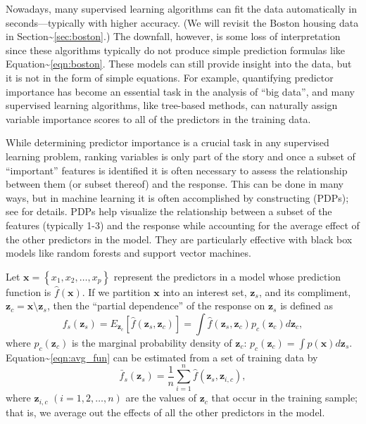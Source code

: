 Nowadays, many supervised learning algorithms can fit the data
automatically in seconds---typically with higher accuracy. (We will
revisit the Boston housing data in
Section\textasciitilde{}\ref{sec:boston}.) The downfall, however, is
some loss of interpretation since these algorithms typically do not
produce simple prediction formulas like
Equation\textasciitilde{}\eqref{eqn:boston}. These models can still
provide insight into the data, but it is not in the form of simple
equations. For example, quantifying predictor importance has become an
essential task in the analysis of ``big data'', and many supervised
learning algorithms, like tree-based methods, can naturally assign
variable importance scores to all of the predictors in the training
data.

While determining predictor importance is a crucial task in any
supervised learning problem, ranking variables is only part of the story
and once a subset of ``important'' features is identified it is often
necessary to assess the relationship between them (or subset thereof)
and the response. This can be done in many ways, but in machine learning
it is often accomplished by constructing 
(PDPs); see \citet{friedman-2001-greedy} for details. PDPs help
visualize the relationship between a subset of the features (typically
1-3) and the response while accounting for the average effect of the
other predictors in the model. They are particularly effective with
black box models like random forests and support vector machines.

Let \(\boldsymbol{x} = \left\{x_1, x_2, \dots, x_p\right\}\) represent
the predictors in a model whose prediction function is
\(\widehat{f}\left(\boldsymbol{x}\right)\). If we partition
\(\boldsymbol{x}\) into an interest set, \(\boldsymbol{z}_s\), and its
compliment,
\(\boldsymbol{z}_c = \boldsymbol{x} \setminus \boldsymbol{z}_s\), then
the ``partial dependence'' of the response on \(\boldsymbol{z}_s\) is
defined as \begin{equation}
\label{eqn:avg_fun}
  f_s\left(\boldsymbol{z}_s\right) = E_{\boldsymbol{z}_c}\left[\widehat{f}\left(\boldsymbol{z}_s, \boldsymbol{z}_c\right)\right] = \int \widehat{f}\left(\boldsymbol{z}_s, \boldsymbol{z}_c\right)p_{c}\left(\boldsymbol{z}_c\right)d\boldsymbol{z}_c,
\end{equation} where \(p_{c}\left(\boldsymbol{z}_c\right)\) is the
marginal probability density of \(\boldsymbol{z}_c\):
\(p_{c}\left(\boldsymbol{z}_c\right) = \int p\left(\boldsymbol{x}\right)d\boldsymbol{z}_s\).
Equation\textasciitilde{}\eqref{eqn:avg_fun} can be estimated from a set
of training data by \begin{equation}
\label{eqn:pdf}
\bar{f}_s\left(\boldsymbol{z}_s\right) = \frac{1}{n}\sum_{i = 1}^n\widehat{f}\left(\boldsymbol{z}_s,\boldsymbol{z}_{i, c}\right),
\end{equation} where \(\boldsymbol{z}_{i, c}\)
\(\left(i = 1, 2, \dots, n\right)\) are the values of
\(\boldsymbol{z}_c\) that occur in the training sample; that is, we
average out the effects of all the other predictors in the model.

